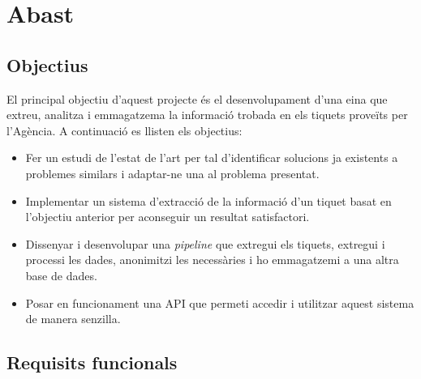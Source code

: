 \section{Abast}

\subsection{Objectius} \label{ssec:objectius}

El principal objectiu d'aquest projecte és el desenvolupament d'una eina que extreu, analitza i emmagatzema la informació trobada en els tiquets proveïts per l'Agència. A continuació es llisten els objectius:

\begin{itemize}
    \item Fer un estudi de l'estat de l'art per tal d'identificar solucions ja existents a problemes similars i adaptar-ne una al problema presentat.
    \item Implementar un sistema d'extracció de la informació d'un tiquet basat en l'objectiu anterior per aconseguir un resultat satisfactori.
    \item Dissenyar i desenvolupar una \textit{pipeline} que extregui els tiquets, extregui i processi les dades, anonimitzi les necessàries i ho emmagatzemi a una altra base de dades. 
    \item Posar en funcionament una API que permeti accedir i utilitzar aquest sistema de manera senzilla.
\end{itemize}


\subsection{Requisits funcionals}

